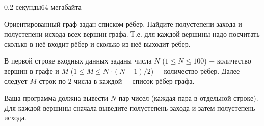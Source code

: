 \begin{problem}{}{}{}{0.2 секунды}{64 мегабайта}

Ориентированный граф задан списком рёбер. Найдите полустепени захода и полустепени исхода всех вершин графа.
Т.е. для каждой вершины надо посчитать сколько в неё входит рёбер и сколько из неё выходит рёбер.

\InputFile
В первой строке входных данных заданы числа $N$ ($1 \le N \le 100$) $-$ количество вершин в графе и 
$M$ ($1 \le M \le N\cdot (N-1)/2$) $-$ количество рёбер.
Далее следует $M$ строк по $2$ числа в каждой $-$ список рёбер графа. 

\OutputFile
Ваша программа должна вывести $N$ пар чисел (каждая пара в отдельной строке). Для каждой вершины сначала выведите 
полустепень захода и затем полустепень исхода.

\Example

\begin{example}
%
\end{example}

\end{problem}

